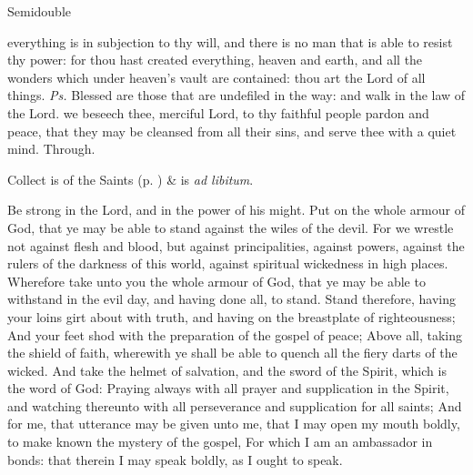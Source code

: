 \label{trinity}
\begin{inhead}
{Semidouble}
\end{inhead}

\properantiphonfix

\introit
{} everything is in subjection to thy will, and there is no man that is able to resist thy power: for thou hast created everything, heaven and earth, and all the wonders which under heaven's vault are contained: thou art the Lord of all things. \textit{Ps.} Blessed are those that are undefiled in the way: and walk in the law of the Lord.
\collect
{} we beseech thee, merciful Lord, to thy faithful people pardon and peace, that they may be cleansed from all their sins, and serve thee with a quiet mind. Through.
\begin{rubric}
     Collect is of the Saints (p. \pageref{SPSaints}) \&  is \emph{ad libitum}.
\end{rubric}

 Be strong in the Lord, and in the power of his might. Put on the whole armour of God, that ye may be able to stand against the wiles of the devil. For we wrestle not against flesh and blood, but against principalities, against powers, against the rulers of the darkness of this world, against spiritual wickedness in high places. Wherefore take unto you the whole armour of God, that ye may be able to withstand in the evil day, and having done all, to stand. Stand therefore, having your loins girt about with truth, and having on the breastplate of righteousness; And your feet shod with the preparation of the gospel of peace; Above all, taking the shield of faith, wherewith ye shall be able to quench all the fiery darts of the wicked. And take the helmet of salvation, and the sword of the Spirit, which is the word of God: Praying always with all prayer and supplication in the Spirit, and watching thereunto with all perseverance and supplication for all saints; And for me, that utterance may be given unto me, that I may open my mouth boldly, to make known the mystery of the gospel, For which I am an ambassador in bonds: that therein I may speak boldly, as I ought to speak.


